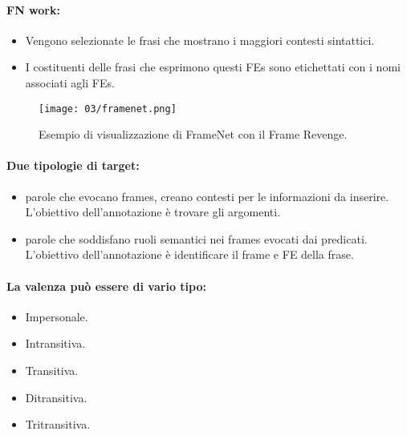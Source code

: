 \paragraph{FN work:}

\begin{itemize}
  \item Vengono selezionate le frasi che mostrano i maggiori contesti sintattici. 
  \item I costituenti delle frasi che esprimono questi FEs sono etichettati con i nomi associati agli FEs.
\end{itemize}

\begin{figure}[h]
    \centering
    \texttt{[image: 03/framenet.png]}
    \caption{Esempio di visualizzazione di FrameNet con il Frame Revenge.}
\end{figure}

\paragraph{Due tipologie di target:}

\begin{itemize}
  \item {} parole che evocano frames, creano contesti per le informazioni da inserire. L'obiettivo dell'annotazione è trovare gli argomenti.
  \item {} parole che soddisfano ruoli semantici nei frames evocati dai predicati. L'obiettivo dell'annotazione è identificare il frame e FE della frase.
\end{itemize}



\paragraph{La valenza può essere di vario tipo:}

\begin{itemize}
  \item Impersonale. 
  \item Intransitiva. 
  \item Transitiva. 
  \item Ditransitiva. 
  \item Tritransitiva.
\end{itemize}

